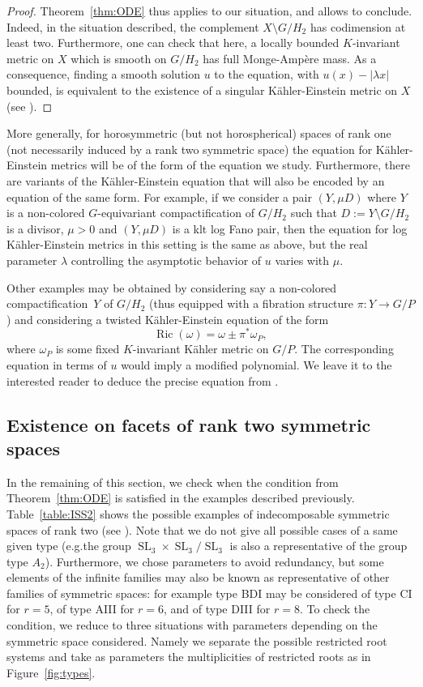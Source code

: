 \documentclass[10pt]{amsart}
\theoremstyle{plain}
\theoremstyle{definition}
\DeclareMathOperator{\Ric}{Ric}
\DeclareMathOperator{\SL}{SL}
\providecommand{\eg}{e.g.}\providecommand{\ie}{i.e.}\providecommand{\etc}{etc.}\providecommand{\resp}{resp.}\providecommand{\cf}{cf.}
\begin{document}
\begin{proof}
Theorem~\ref{thm:ODE} thus applies to our situation, and allows to conclude.
Indeed, in the situation described, the complement $X\setminus G/H_2$ has
codimension at least two. Furthermore, one can check that here, a locally
bounded $K$-invariant metric on $X$ which is smooth on $G/H_2$ has full Monge-Ampère mass.
As a consequence, finding a smooth solution $u$ to the equation, with $u(x)-|\lambda x|$
bounded, is equivalent to the existence of a singular Kähler-Einstein metric on $X$
(see \cite[\S3]{BBEGZ}).
\end{proof}

More generally, for horosymmetric (but not horospherical) spaces of rank one
(not necessarily induced by a rank two symmetric space) the equation for
Kähler-Einstein metrics will be of the form of the
equation we study. Furthermore, there are variants of the Kähler-Einstein equation
that will also be encoded by an equation of the same form.
For example, if we consider a pair $(Y,\mu D)$ where $Y$ is a non-colored $G$\nobreakdash-equivariant
compactification of $G/H_2$ such that $D:=Y\setminus G/H_2$ is a divisor, $\mu>0$
and $(Y,\mu D)$ is a klt log Fano pair, then the equation for log Kähler-Einstein
metrics in this setting is the same as above, but the real parameter $\lambda$
controlling the asymptotic behavior of $u$ varies with $\mu$.

Other examples may be obtained by considering say a non-colored compactification~$Y$ of
$G/H_2$ (thus equipped with a fibration structure $\pi:Y\to G/P$)
and considering a twisted Kähler-Einstein equation of the form
\[ \Ric(\omega)=\omega\pm \pi^*\omega_P, \]
where $\omega_P$ is some fixed $K$-invariant Kähler metric on $G/P$.
The corresponding equation in terms of $u$ would imply a modified polynomial.
We leave it to the interested reader to deduce the precise equation from
\cite{DelHoro}.

\subsection{Existence on facets of rank two symmetric spaces}
\label{sec:checks}

In the remaining of this section, we check when the condition from Theorem~\ref{thm:ODE}
is satisfied in the examples described previously.
Table~\ref{table:ISS2} shows the possible examples of
indecomposable symmetric spaces of rank two (see \cite[p.\,532]{Hel78}).
Note that we do not give all possible
cases of a same given type (\eg the group $\SL_3\times \SL_3/\SL_3$ is also a representative
of the group type $A_2$).
Furthermore, we chose parameters to avoid redundancy, but some elements of the infinite
families may also be known as representative of other families of symmetric spaces:
for example type BDI may be considered of type CI for $r=5$, of type AIII for $r=6$,
and of type DIII for $r=8$.
To check the condition, we reduce to three situations with parameters depending on
the symmetric space considered. Namely we separate the possible restricted root systems
and take as parameters the multiplicities of restricted roots as in Figure~\ref{fig:types}.
\end{document}
